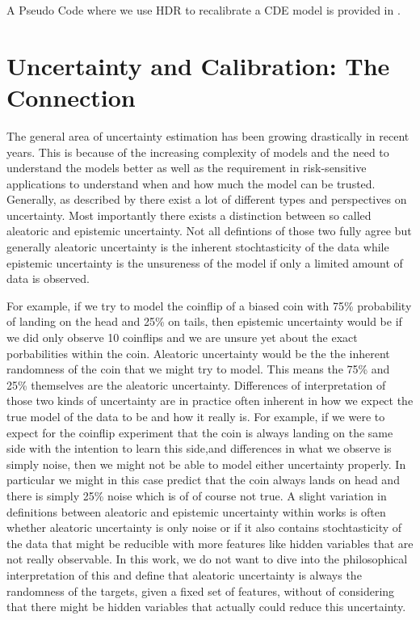 A Pseudo Code where we use HDR to recalibrate a CDE model is provided in .

\section{Uncertainty and Calibration: The Connection}\label{sec:uncertainty_calibration}

The general area of uncertainty estimation has been growing drastically in recent years. This is because of the increasing complexity of models and the need to understand the models better as well as the requirement in risk-sensitive applications to understand when and how much the model can be trusted. Generally, as described by \cite{hullermeier_aleatoric_2021} there exist a lot of different types and perspectives on uncertainty. Most importantly there exists a distinction between so called aleatoric and epistemic uncertainty. Not all defintions of those two fully agree but generally aleatoric uncertainty is the inherent stochtasticity of the data while epistemic uncertainty is the unsureness of the model if only a limited amount of data is observed.

For example, if we try to model the coinflip of a biased coin with 75\% probability of landing on the head and 25\% on tails, then epistemic uncertainty would be if we did only observe 10 coinflips and we are unsure yet about the exact porbabilities within the coin. Aleatoric uncertainty would be the the inherent randomness of the coin that we might try to model. This means the 75\% and 25\% themselves are the aleatoric uncertainty. 
Differences of interpretation of those two kinds of uncertainty are in practice often inherent in how we expect the true model of the data to be and how it really is. For example, if we were to expect for the coinflip experiment that the coin is always landing on the same side with the intention to learn this side,and differences in what we observe is simply noise, then we might not be able to model either uncertainty properly. In particular we might in this case predict that the coin always lands on head and there is simply 25\% noise which is of of course not true.
A slight variation in definitions between aleatoric and epistemic uncertainty within works \cite{hullermeier_aleatoric_2021} is often whether aleatoric uncertainty is only noise or if it also contains stochtasticity of the data that might be reducible with more features like hidden variables that are not really observable. In this work, we do not want to dive into the philosophical interpretation of this and define that aleatoric uncertainty is always the randomness of the targets, given a fixed set of features, without of considering that there might be hidden variables that actually could reduce this uncertainty.


